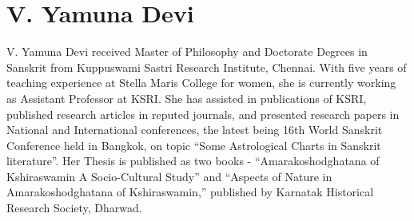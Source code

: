 \section*{V. Yamuna Devi}

V. Yamuna Devi received Master of Philosophy and Doctorate Degrees in Sanskrit from Kuppuswami Sastri Research Institute, Chennai. With five years of teaching experience at Stella Maris College for women, she is currently working as Assistant Professor at KSRI. She has assisted in publications of KSRI, published research articles in reputed journals, and presented research papers in National and International conferences, the latest being 16th World Sanskrit Conference held in Bangkok, on topic “Some Astrological Charts in Sanskrit literature”. Her Thesis is published as two books - “Amarakoshodghatana of Kshiraswamin A Socio-Cultural Study” and “Aspects of Nature in Amarakoshodghatana of Kshiraswamin,” published by Karnatak Historical Research Society, Dharwad.

